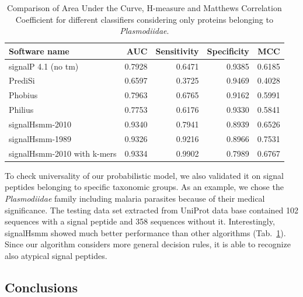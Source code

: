 \documentclass[fleqn,10pt,twoside]{gcb15submission}
\begin{document}
\begin{table}[ht]
\small
\centering
\caption{Comparison of Area Under the Curve, H-measure and Matthews Correlation Coefficient for different classifiers considering only proteins belonging to \textsl{Plasmodiidae}.} 
\begin{tabular}{lrrrr}
  \toprule
Software name & AUC & Sensitivity & Specificity & MCC \\ 
  \midrule
signalP 4.1 (no tm) \citep{2011petersensignalp} & 0.7928 & 0.6471 & 0.9385 & 0.6185 \\ 
   \rowcolor[gray]{0.85}PrediSi \citep{2004hillerpredisi} & 0.6597 & 0.3725 & 0.9469 & 0.4028 \\ 
  Phobius \citep{2004klla} & 0.7963 & 0.6765 & 0.9162 & 0.5991 \\ 
   \rowcolor[gray]{0.85}Philius \citep{2008reynoldstransmembrane} & 0.7753 & 0.6176 & 0.9330 & 0.5841 \\ 
  signalHsmm-2010 & 0.9340 & 0.7941 & 0.8939 & 0.6526 \\ 
   \rowcolor[gray]{0.85}signalHsmm-1989 & 0.9326 & 0.9216 & 0.8966 & 0.7531 \\ 
  signalHsmm-2010 with k-mers & 0.9334 & 0.9902 & 0.7989 & 0.6767 \\ 
   \bottomrule
\end{tabular}
\label{tab:bench2010plas}
\end{table}

To check universality of our probabilistic model, we also validated it on signal peptides belonging to specific taxonomic groups. As an example, we chose the \textsl{Plasmodiidae} family including malaria parasites because of their medical significance. The testing data set extracted from UniProt data base contained 102 sequences with a signal peptide and 358 sequences without it. Interestingly, signalHsmm showed much better performance than other algorithms (Tab.~\ref{tab:bench2010plas}). Since our algorithm considers more general decision rules, it is able to recognize also atypical signal peptides.


\subsection*{Conclusions}
\end{document}
